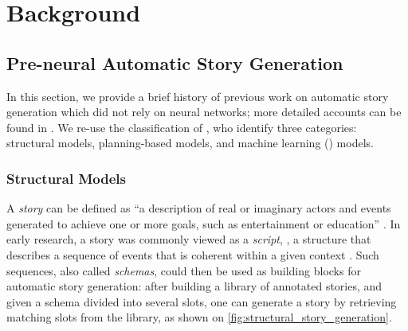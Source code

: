 \chapter{Background}
\minitoc
\newpage


\section{Pre-neural Automatic Story Generation}
\label{sec:preneural_asg}

In this section, we provide a brief history of previous work on automatic story generation which did not rely on neural networks; more detailed accounts can be found in \citet{kybartas2016survey, alhussain2021automatic}. We re-use the classification of \citet{alhussain2021automatic}, who identify three categories: structural models, planning-based models, and machine learning (\ml) models. 

\subsection{Structural Models}
\label{sub:structural_models}

A \emph{story} can be defined as ``a description of real or imaginary actors and events generated to achieve one or more goals, such as entertainment or education'' \citep{alhussain2021automatic}. In early research, a story was commonly viewed as a \emph{script}, \ie, a structure that describes a sequence of events that is coherent within a given context \citep{schank2013scripts}. Such sequences, also called \emph{schemas}, could then be used as building blocks for automatic story generation: after building a library of annotated stories, and given a schema divided into several slots, one can generate a story by retrieving matching slots from the library, as shown on \autoref{fig:structural_story_generation}.

